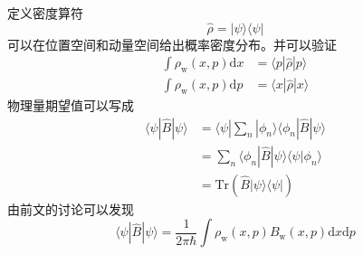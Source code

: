         定义密度算符
        \begin{equation*}
            \hat{\rho} = |\psi \rangle \langle \psi |
        \end{equation*}
        可以在位置空间和动量空间给出概率密度分布。并可以验证
        \begin{align*}
            \int \rho_\mathrm{w}(x,p) \mathrm{d}x &= \langle p|\hat{\rho}|p \rangle\\
            \int \rho_\mathrm{w}(x,p) \mathrm{d}p &= \langle x|\hat{\rho}|x \rangle
        \end{align*}
        物理量期望值可以写成
        \begin{align*}
            \langle \psi | \hat{B} | \psi \rangle &=  \langle \psi |\sum_n | \phi_n \rangle \langle \phi_n | \hat{B} | \psi \rangle\\
            &= \sum_n \langle \phi_n | \hat{B} | \psi \rangle \langle \psi  | \phi_n \rangle\\
            &= \mathrm{Tr} (\hat{B}|\psi \rangle \langle \psi |)
        \end{align*}
        由前文的讨论可以发现
        \begin{equation*}
            \langle \psi|\hat{B}|\psi \rangle = \frac 1{2\pi \hbar} \int \rho_\mathrm{w}(x,p) B_\mathrm{w}(x,p) \mathrm{d}x\mathrm{d}p
        \end{equation*}
        
    